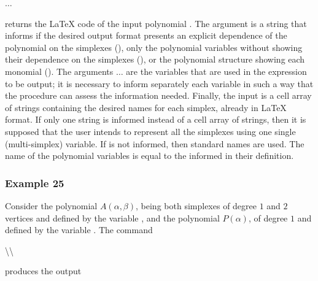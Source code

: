 \documentclass[english,11pt]{article}
\theoremstyle{break} \theorembodyfont{\small\rm}
\begin{document}
\vspace{0.5cm}%
\begin{minipage}{9.5cm}
$\ldots$
\end{minipage}
\vspace{0.2cm}

\noindent returns the {\LaTeX} code of the input polynomial . The argument
 is a string that informs if the desired output format presents an
explicit dependence of the polynomial on the simplexes (),
only the polynomial variables without showing their dependence on the simplexes (),
or the polynomial structure showing each monomial (). The 
arguments $\ldots$ are the variables that are used in the expression
to be output; it is necessary to inform separately each variable in such a way that the procedure can 
assess the information needed. Finally, the input  is a cell array of strings
containing the desired names for each simplex, already in {\LaTeX} format. If
only one string is informed instead of a cell array of strings, then it is supposed that 
the user intends to represent all the simplexes using one single (multi-simplex) variable.
If  is not informed, then standard names are used. The name of the
polynomial variables is equal to the  informed in their definition.

\subsubsection*{Example 25}

Consider the polynomial $A(\alpha,\beta)$, being both simplexes of degree $1$ and $2$ vertices
and defined by the variable , and the polynomial $P(\alpha)$, of degree $1$
and defined by the variable . The command

\vspace{0.5cm}%
\begin{minipage}{20.5cm}
\textbackslash{}\textbackslash{}
\end{minipage}
\vspace{0.2cm}

\noindent produces the output
\end{document}
